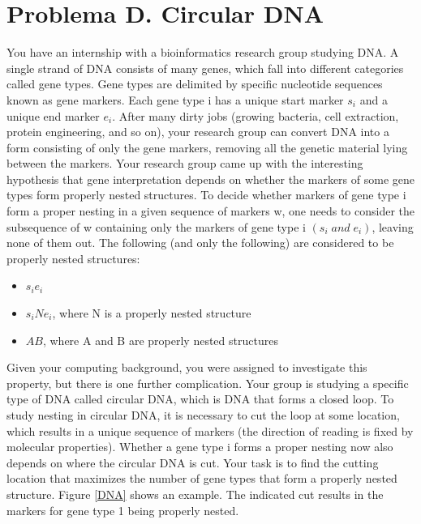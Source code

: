 \documentclass{report}
\begin{document}
\section{Problema D. Circular DNA}
\label{ProblemD}
You have an internship with a bioinformatics research group studying DNA. A single strand of DNA
consists of many genes, which fall into different categories called gene types. Gene types are delimited
by specific nucleotide sequences known as gene markers. Each gene type i has a unique start marker $s_i$
and a unique end marker $e_i$. After many dirty jobs (growing bacteria, cell extraction, protein engineering,
and so on), your research group can convert DNA into a form consisting of only the gene markers,
removing all the genetic material lying between the markers.
Your research group came up with the interesting hypothesis that gene interpretation depends on whether
the markers of some gene types form properly nested structures. To decide whether markers of gene type
i form a proper nesting in a given sequence of markers w, one needs to consider the subsequence of w
containing only the markers of gene type i $(s_i\; and\; e_i)$, leaving none of them out. The following (and
only the following) are considered to be properly nested structures:\\
\begin{itemize}
\item $s_ie_i$
\item $s_iNe_i$, where N is a properly nested structure
\item $AB$, where A and B are properly nested structures

\end{itemize}
Given your computing background, you were assigned to investigate this property, but there is one
further complication. Your group is studying a specific type of DNA called circular DNA, which is
DNA that forms a closed loop. To study nesting in circular DNA, it is necessary to cut the loop at some
location, which results in a unique sequence of markers (the direction of reading is fixed by molecular
properties). Whether a gene type i forms a proper nesting now also depends on where the circular
DNA is cut. Your task is to find the cutting location that maximizes the number of gene types that form a
properly nested structure. Figure \ref{DNA} shows an example. The indicated
cut results in the markers for gene type 1 being properly nested.\\
\end{document}
